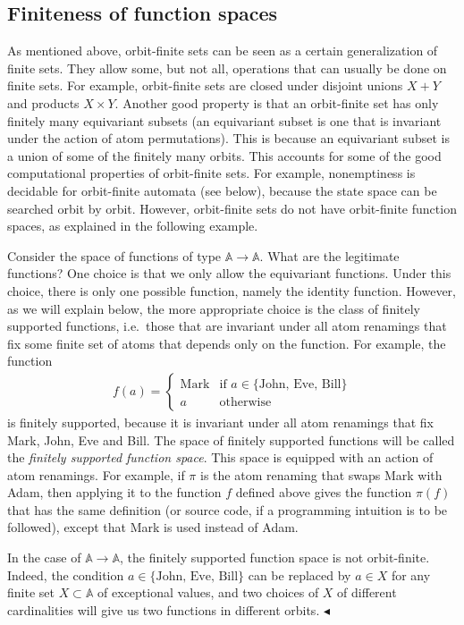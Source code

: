 \documentclass[10pt,a4paper]{amsart}
\numberwithin{equation}{section}
\theoremstyle{plain}
\newcommand{\set}[1]{\{#1\}}
\newcommand{\atoms}{\mathbb A}
\newcommand{\exampleend}{$\blacktriangleleft$}
\begin{document}

\subsection{Finiteness of function spaces}
\label{sec:orbit-finite-function-spaces}
As mentioned above, orbit-finite sets can be seen as  a certain generalization of finite sets. They allow some, but not all, operations that can usually be done on finite sets. For example, orbit-finite sets are closed under disjoint unions $X + Y$ and products $X \times Y$.  Another good property is that an orbit-finite set has only finitely many equivariant subsets (an equivariant subset is one that is invariant under the action of atom permutations). This is because an equivariant subset is a union of some of the finitely many orbits. This accounts for some of the good computational properties of orbit-finite sets. For example, nonemptiness is decidable for orbit-finite automata (see below), because the state space can be searched orbit by orbit.
However, orbit-finite sets do not have orbit-finite function spaces, as explained in the following example. 

\begin{example}
    Consider the space of functions of type $\atoms \to \atoms$. What are the legitimate functions? One choice is that we only allow the equivariant functions. Under this choice, there is only one possible function,  namely the identity function. However, as we will explain below, the more appropriate choice is the class of finitely supported functions, i.e.~those that are invariant under all atom renamings that fix some finite set of atoms that depends only on the function. For example,  the  function
    \begin{align*}
    f(a) = \begin{cases}
        \text{Mark} & \text{if $a \in \set{\text{John, Eve, Bill}}$} \\
        a & \text{otherwise}
    \end{cases}
    \end{align*}
    is finitely supported, because it is invariant under all atom renamings that fix Mark, John, Eve and Bill. The space of finitely supported functions will be called the \emph{finitely supported function space}. This space is equipped with an action of atom renamings. For example, if $\pi$ is the atom renaming that swaps Mark with Adam, then applying it to the function $f$ defined above gives the function $\pi(f)$ that has the same definition (or source code, if a programming intuition is to be followed), except that Mark is used instead of Adam.

    In the case of $\atoms \to \atoms$, the finitely supported function space is not orbit-finite. Indeed, the condition $a \in \set{\text{John, Eve, Bill}}$ can be replaced by $a \in X$ for any finite set $X \subset \atoms$ of exceptional values, and two choices of $X$ of different cardinalities will give us two functions in different orbits. \exampleend
\end{example}
\end{document}
